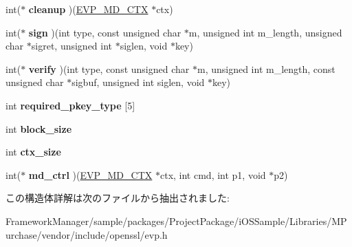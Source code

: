 \begin{DoxyCompactItemize}
\item 
\hypertarget{structenv__md__st_acf24becb13e74703b0995ab0f310dc69}{}int($\ast$ {\bfseries cleanup} )(\hyperlink{structenv__md__ctx__st}{E\+V\+P\+\_\+\+M\+D\+\_\+\+C\+T\+X} $\ast$ctx)\label{structenv__md__st_acf24becb13e74703b0995ab0f310dc69}

\item 
\hypertarget{structenv__md__st_a6c2688ca16aa6280d183f19932a57d3e}{}int($\ast$ {\bfseries sign} )(int type, const unsigned char $\ast$m, unsigned int m\+\_\+length, unsigned char $\ast$sigret, unsigned int $\ast$siglen, void $\ast$key)\label{structenv__md__st_a6c2688ca16aa6280d183f19932a57d3e}

\item 
\hypertarget{structenv__md__st_a10b15f12475626688692fab5b0e51223}{}int($\ast$ {\bfseries verify} )(int type, const unsigned char $\ast$m, unsigned int m\+\_\+length, const unsigned char $\ast$sigbuf, unsigned int siglen, void $\ast$key)\label{structenv__md__st_a10b15f12475626688692fab5b0e51223}

\item 
\hypertarget{structenv__md__st_a508c2571ca6389b14b054c49ba3fe7b3}{}int {\bfseries required\+\_\+pkey\+\_\+type} \mbox{[}5\mbox{]}\label{structenv__md__st_a508c2571ca6389b14b054c49ba3fe7b3}

\item 
\hypertarget{structenv__md__st_ae76b8152ca0ed7e4442d1210ad4bdf88}{}int {\bfseries block\+\_\+size}\label{structenv__md__st_ae76b8152ca0ed7e4442d1210ad4bdf88}

\item 
\hypertarget{structenv__md__st_a3c34817fb557d912821c8f06ae5945ba}{}int {\bfseries ctx\+\_\+size}\label{structenv__md__st_a3c34817fb557d912821c8f06ae5945ba}

\item 
\hypertarget{structenv__md__st_a0f91a62137d598f55b1e7a321ccbf100}{}int($\ast$ {\bfseries md\+\_\+ctrl} )(\hyperlink{structenv__md__ctx__st}{E\+V\+P\+\_\+\+M\+D\+\_\+\+C\+T\+X} $\ast$ctx, int cmd, int p1, void $\ast$p2)\label{structenv__md__st_a0f91a62137d598f55b1e7a321ccbf100}

\end{DoxyCompactItemize}


この構造体詳解は次のファイルから抽出されました\+:\begin{DoxyCompactItemize}
\item 
Framework\+Manager/sample/packages/\+Project\+Package/i\+O\+S\+Sample/\+Libraries/\+M\+Purchase/vendor/include/openssl/evp.\+h\end{DoxyCompactItemize}
